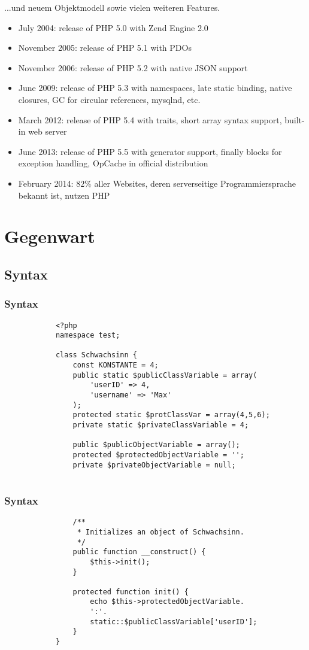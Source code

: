 \documentclass{beamer}
\begin{document}
	\begin{frame}{...und neuem Objektmodell sowie vielen weiteren Features.}
		\begin{itemize}
			\item July 2004: release of PHP 5.0 with Zend Engine 2.0
			\item November 2005: release of PHP 5.1 with PDOs
			\item November 2006: release of PHP 5.2 with native JSON support
			\item June 2009: release of PHP 5.3 with namespaces, late static binding, native closures, GC for circular references, mysqlnd, etc.
			\item March 2012: release of PHP 5.4 with traits, short array syntax support, built-in web server
			\item June 2013: release of PHP 5.5 with generator support, finally blocks for exception handling, OpCache in official distribution
			\item February 2014: $82\%$ aller Websites, deren serverseitige Programmiersprache bekannt ist, nutzen PHP
		\end{itemize}
	\end{frame}
	
	\section{Gegenwart}
	\subsection{Syntax}
	\begin{frame}[fragile]
		\frametitle{Syntax}
		\begin{lstlisting}
			<?php
			namespace test;
			
			class Schwachsinn {
			    const KONSTANTE = 4;
			    public static $publicClassVariable = array(
			        'userID' => 4,
			        'username' => 'Max'
			    );
			    protected static $protClassVar = array(4,5,6);
			    private static $privateClassVariable = 4;
			    
			    public $publicObjectVariable = array();
			    protected $protectedObjectVariable = '';
			    private $privateObjectVariable = null;
			    
		\end{lstlisting}
	\end{frame}
	\begin{frame}[fragile]
		\frametitle{Syntax}
		\begin{lstlisting}	    
			    /**
			     * Initializes an object of Schwachsinn.
			     */
			    public function __construct() {
			        $this->init();
			    }
			    
			    protected function init() {
			        echo $this->protectedObjectVariable.
			        ':'.
			        static::$publicClassVariable['userID'];
			    }
			}
		\end{lstlisting}
	\end{frame}
	
\end{document}
